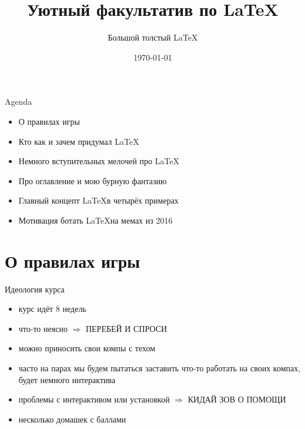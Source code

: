 \documentclass[aspectratio=169,newPxFont]{beamer}
\title{Уютный факультатив по \LaTeX}
\subtitle{Большой толстый \LaTeX}
\date{\today}
\begin{document}
\begingroup
{}
\begin{frame}[plain]
\begin{center}
\Huge{\color{red}{ВНИМАНИЕ!}}
\end{center}

\begin{center}
\end{center}
\end{frame}
\endgroup

 \maketitle
 
\begin{frame}{Agenda}
\begin{itemize}
	\item О правилах игры 
	\item Кто как и зачем придумал \LaTeX
	\item Немного вступительных мелочей про \LaTeX
	\item Про оглавление и мою бурную фантазию 
	\item Главный концепт  \LaTeX в четырёх примерах
	\item Мотивация ботать \LaTeX на мемах из 2016
\end{itemize}
\end{frame}


\section{О правилах игры}


\begin{frame}{Идеология курса}
\begin{itemize}
\item курс идёт 8 недель
\item что-то неясно $\Rightarrow$ \alert{ ПЕРЕБЕЙ И СПРОСИ}
\item можно приносить свои компы с техом
\item часто на парах мы будем пытаться заставить что-то работать на своих компах, будет немного интерактива
\item проблемы с интерактивом или установкой  $\Rightarrow$ \alert{КИДАЙ ЗОВ О ПОМОЩИ} 
\item несколько домашек с баллами
\end{itemize}
\end{frame}
\end{document}
